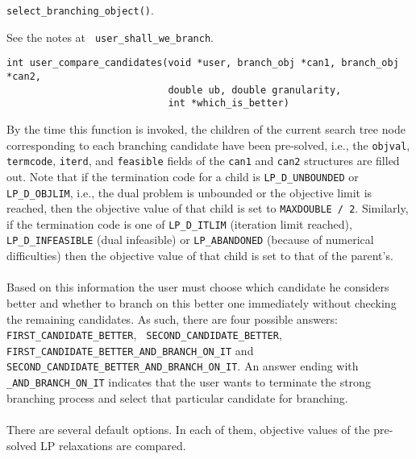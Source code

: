 \item[Wrapper invoked from:] {\tt select\_branching\_object()}.

\item[Notes:] See the notes at {\tt {}
{user_shall_we_branch}}.

\ed

\vspace{1ex}



\label{user_compare_candidates}
\begin{verbatim}
int user_compare_candidates(void *user, branch_obj *can1, branch_obj *can2,
                            double ub, double granularity, 
                            int *which_is_better)
\end{verbatim}

\bd
\describe

By the time this function is invoked, the children of the current search tree
node corresponding to each branching candidate have been pre-solved, i.e., the
{\tt objval}, {\tt termcode}, {\tt iterd}, and {\tt feasible} fields of the
{\tt can1} and {\tt can2} structures are filled out. Note that if the
termination code for a child is {\tt LP\_D\_UNBOUNDED} or {\tt LP\_D\_OBJLIM},
i.e., the dual problem is unbounded or the objective limit is reached, then
the objective value of that child is set to {\tt MAXDOUBLE / 2}. Similarly, if
the termination code is one of {\tt LP\_D\_ITLIM} (iteration limit reached),
{\tt LP\_D\_INFEASIBLE} (dual infeasible) or {\tt LP\_ABANDONED} (because of
numerical difficulties) then the objective value of that child is set to that
of the parent's.\\
\\
Based on this information the user must choose which candidate he
considers better and whether to branch on this better one immediately
without checking the remaining candidates. As such, there are four
possible answers: {\tt FIRST\_CANDIDATE\_BETTER}, \hfill {\tt
SECOND\_CANDIDATE\_BETTER}, \hfill {\tt
FIRST\_CANDIDATE\_BETTER\_AND\_BRANCH\_ON\_IT} and {\tt
SECOND\_CANDIDATE\_BETTER\_AND\_BRANCH\_ON\_IT}. An answer ending with
{\tt \_AND\_BRANCH\_ON\_IT} indicates that the user wants to terminate
the strong branching process and select that particular candidate for
branching.\\
\\
There are several default options. In each of them, objective values of
the pre-solved LP relaxations are compared. 

